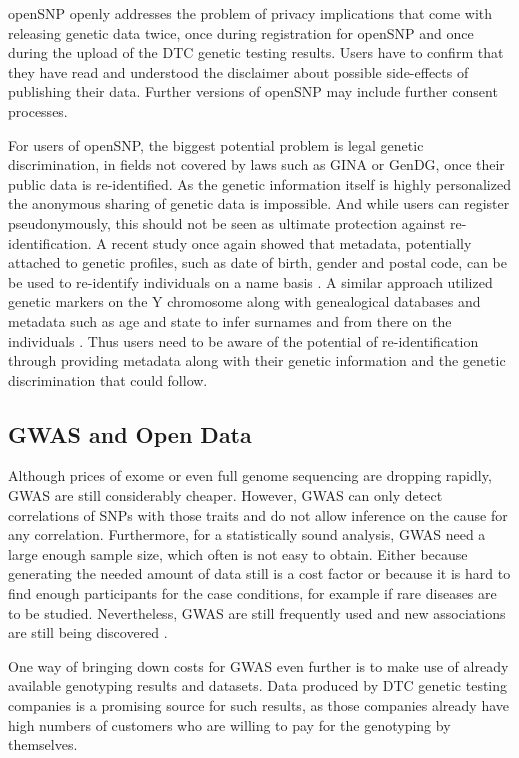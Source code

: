 \documentclass[10pt]{article}
\begin{document}
openSNP openly addresses the problem of privacy implications that come with releasing genetic data twice, once during registration for openSNP and once during 
the upload of the DTC genetic testing results. Users have to confirm that they have read and understood the disclaimer about possible side-effects 
of publishing their data. Further versions of openSNP may include further consent processes.

For users of openSNP, the biggest potential problem is legal genetic discrimination, in fields not covered by laws such as GINA or GenDG, once their public data is re-identified. As the genetic information itself is highly personalized the anonymous sharing of genetic data is impossible. And while users can register pseudonymously, this should not be seen as ultimate protection against re-identification. 
A recent study once again showed that metadata, potentially attached to genetic profiles, such as date of birth, gender and postal code, can be be used to re-identify individuals on a name basis \cite{Sweeney2013}. 
A similar approach utilized genetic markers on the Y chromosome along with genealogical databases and metadata such as age and state to infer surnames and from there on the individuals \cite{Gymrek18012013}. 
Thus users need to be aware of the potential of re-identification through providing metadata along with their genetic information and the genetic discrimination that could follow.

\subsection*{GWAS and Open Data}
Although prices of exome or even full genome sequencing are dropping rapidly, GWAS are still considerably cheaper. However, GWAS can only detect correlations of SNPs with those traits and do not allow inference on the cause for any correlation. Furthermore, for a statistically sound analysis, GWAS need a large enough sample size, which often is not easy to obtain. Either because generating the needed amount of data still is a cost factor or because it is hard to find enough participants for the case conditions, for example if rare diseases are to be studied. Nevertheless, GWAS are still frequently used and new associations are still being discovered \cite{10.1371.journal.pone.0031470,10.1371.journal.pone.0030309,10.1371.journal.pone.0029848}. 

One way of bringing down costs for GWAS even further is to make use of already available genotyping results and datasets. 
Data produced by DTC genetic testing companies is a promising source for such results, as those companies already have high 
numbers of customers who are willing to pay for the genotyping by themselves. 
\end{document}
